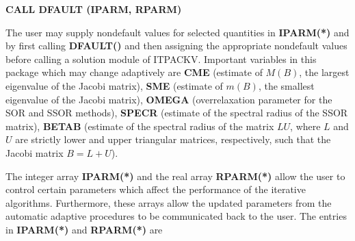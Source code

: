 \bigskip
\centerline{\bf CALL DFAULT (IPARM, RPARM)}
\bigskip
 
\noindent
The user may supply nondefault values for selected quantities in 
{\bf IPARM(*)} and  by first calling 
{\bf DFAULT()} and 
then assigning the appropriate nondefault values before calling a 
solution module of ITPACKV.  Important variables in this package which 
may change adaptively are {\bf CME} (estimate of $M(B)$, the largest 
eigenvalue of the Jacobi matrix), {\bf SME} (estimate of $m(B)$, the 
smallest eigenvalue of the Jacobi matrix), {\bf OMEGA} (overrelaxation 
parameter for the SOR and SSOR methods), {\bf SPECR} (estimate of the 
spectral radius of the SSOR matrix), {\bf BETAB} (estimate of the 
spectral radius of the matrix $LU$, where $L$ and $U$ are strictly 
lower and upper triangular matrices, respectively, such that the Jacobi 
matrix $B=L+U$).
 
The integer array {\bf IPARM(*)} and the real array {\bf RPARM(*)} allow 
the user to control certain parameters which affect the performance 
of the iterative algorithms.  Furthermore, these arrays allow the 
updated parameters from the automatic adaptive procedures to be 
communicated back to the user.  The entries in {\bf IPARM(*)} and 
{\bf RPARM(*)} are

